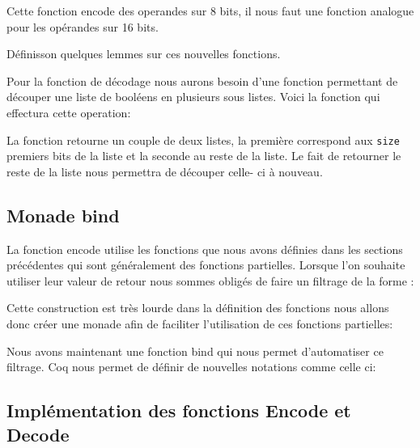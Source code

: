 \documentclass {article}
\newcommand{\codefrom}[3]
           {}
\theoremstyle{definition}
\theoremstyle{remark}
\newcommand{\fun}[1]{\lstinline!#1!}
\begin{document}
Cette fonction encode des operandes sur 8 bits, il nous faut une fonction analogue pour les opérandes sur 16 bits.

\codefrom{src}{encode}{operand_to_bin_double}

Définisson quelques lemmes sur ces nouvelles fonctions.
\codefrom{src}{encode}{operand_to_bin_hypothesis_reg}
\codefrom{src}{encode}{operand_to_bin_hypothesis_imm}
\codefrom{src}{encode}{operand_to_bin_size}


Pour la fonction de décodage nous aurons besoin d'une fonction permettant de découper
une liste de booléens en plusieurs sous listes. Voici la fonction qui effectura cette operation:

\codefrom{src}{encode}{get_first_n_bit}

La fonction retourne un couple de deux listes, la première correspond aux \fun{size} premiers
bits de la liste et la seconde au reste  de la liste. Le fait de retourner le reste de la liste
nous permettra de découper celle- ci à nouveau.





\subsection{Monade bind}

La fonction encode utilise les fonctions que nous avons définies dans les sections précédentes qui sont généralement
des fonctions partielles. Lorsque l'on souhaite utiliser leur valeur de retour nous sommes obligés de faire un
filtrage de la forme :

\codefrom{rapport}{definitions}{pattern_matching}

Cette construction est très lourde dans la définition des fonctions nous allons donc créer une monade
afin de faciliter l'utilisation de ces fonctions partielles:

\codefrom{src}{encode}{monade}

Nous avons maintenant une fonction bind qui nous permet d'automatiser ce filtrage. Coq nous permet de
définir de nouvelles notations comme celle ci:

\codefrom{src}{encode}{notation}




\subsection{Implémentation des fonctions Encode et Decode}
\end{document}
